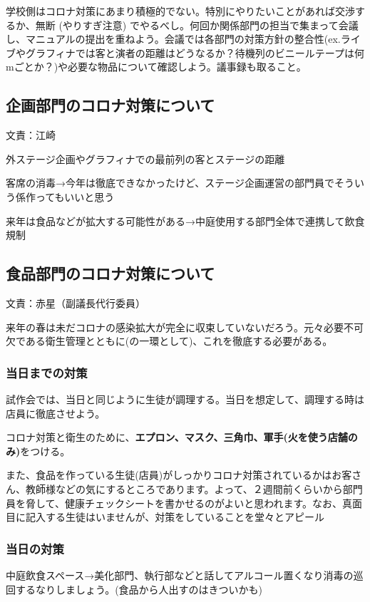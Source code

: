 \documentclass[dvipdfmx,jb5]{jarticle}
\begin{document}
学校側はコロナ対策にあまり積極的でない。特別にやりたいことがあれば交渉するか、無断 (やりすぎ注意) でやるべし。何回か関係部門の担当で集まって会議し、マニュアルの提出を重ねよう。会議では各部門の対策方針の整合性(ex.ライブやグラフィナでは客と演者の距離はどうなるか？待機列のビニールテープは何mごとか？)や必要な物品について確認しよう。議事録も取ること。

\subsection{企画部門のコロナ対策について} 文責：江崎 \vspace{2mm}

外ステージ企画やグラフィナでの最前列の客とステージの距離

客席の消毒→今年は徹底できなかったけど、ステージ企画運営の部門員でそういう係作ってもいいと思う

来年は食品などが拡大する可能性がある→中庭使用する部門全体で連携して飲食規制

\subsection{食品部門のコロナ対策について} 文責：赤星（副議長代行委員） \vspace{2mm}

来年の春は未だコロナの感染拡大が完全に収束していないだろう。元々必要不可欠である衛生管理とともに(の一環として)、これを徹底する必要がある。

\subsubsection{当日までの対策}
試作会では、当日と同じように生徒が調理する。当日を想定して、調理する時は店員に徹底させよう。

コロナ対策と衛生のために、{\bf エプロン、マスク、三角巾、軍手(火を使う店舗のみ)}をつける。

また、食品を作っている生徒(店員)がしっかりコロナ対策されているかはお客さん、教師様などの気にするところであります。よって、２週間前くらいから部門員を脅して、健康チェックシートを書かせるのがよいと思われます。なお、真面目に記入する生徒はいませんが、対策をしていることを堂々とアピール


\subsubsection{当日の対策}
中庭飲食スペース→美化部門、執行部などと話してアルコール置くなり消毒の巡回するなりしましょう。(食品から人出すのはきついかも)
\end{document}
